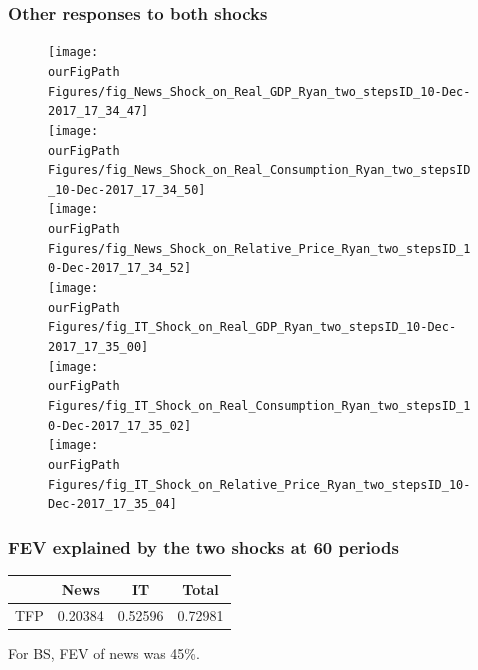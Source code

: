 \documentclass{beamer}
\def \ourFigPath {../../}
\begin{document}
\begin{frame}
\frametitle{Other responses to  both shocks}

\vspace{-0.2cm}
\begin{figure}
\begin{multicols}{2}
\centering 
\texttt{[image: \\ourFigPath Figures/fig\_News\_Shock\_on\_Real\_GDP\_Ryan\_two\_stepsID\_10-Dec-2017\_17\_34\_47]}\\ 
\vspace{0.3cm}
\texttt{[image: \\ourFigPath Figures/fig\_News\_Shock\_on\_Real\_Consumption\_Ryan\_two\_stepsID\_10-Dec-2017\_17\_34\_50]}\\ 
\vspace{0.3cm}
\texttt{[image: \\ourFigPath Figures/fig\_News\_Shock\_on\_Relative\_Price\_Ryan\_two\_stepsID\_10-Dec-2017\_17\_34\_52]}\\ 


\texttt{[image: \\ourFigPath Figures/fig\_IT\_Shock\_on\_Real\_GDP\_Ryan\_two\_stepsID\_10-Dec-2017\_17\_35\_00]}\\
\vspace{0.3cm}
\texttt{[image: \\ourFigPath Figures/fig\_IT\_Shock\_on\_Real\_Consumption\_Ryan\_two\_stepsID\_10-Dec-2017\_17\_35\_02]}\\ 
\vspace{0.3cm}
\texttt{[image: \\ourFigPath Figures/fig\_IT\_Shock\_on\_Relative\_Price\_Ryan\_two\_stepsID\_10-Dec-2017\_17\_35\_04]}\\ 

\end{multicols}
\end{figure}


\end{frame}


\begin{frame}
	\frametitle{FEV explained by the two shocks at 60 periods}


    \hspace{2.25cm}
\begin{large}
	\begin{tabular}{lccc}
	\hline
		& News & IT & Total \\
		\hline
	TFP	           & 0.20384  & 0.52596 & 0.72981  \\
		\hline
	\end{tabular}
\end{large}

\vspace{2cm}

For BS, FEV of news was 45\%.
		 	
\end{frame}
\end{document}
